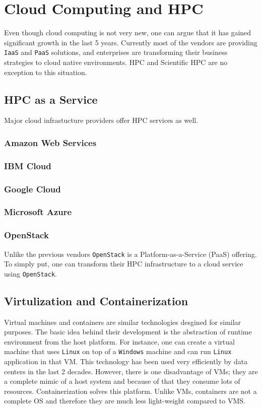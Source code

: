 \chapter{Cloud Computing and HPC}
Even though cloud computing is not very new, one can argue that it has gained significant growth
in the last 5 years. Currently most of the vendors are providing \texttt{IaaS} and \texttt{PaaS}
solutions, and enterprises are transforming their business strategies to cloud native environments. 
\newline \newline
HPC and Scientific HPC are no exception to this situation.

\section{HPC as a Service}
Major cloud infrastucture providers offer HPC services as well.
\subsection{Amazon Web Services}
\subsection{IBM Cloud}
\subsection{Google Cloud}
\subsection{Microsoft Azure}
\subsection{OpenStack}
Unlike the previous vendors \texttt{OpenStack} is a Platform-as-a-Service (PaaS) offering. To simply
put, one can transform their HPC infrastructure to a cloud service using \texttt{OpenStack}.

\section{Virtulization and Containerization}
Virtual machines and containers are similar technologies desgined for similar purposes. The basic
idea behind their development is the abstraction of runtime environment from the host platform. 
For instance, one can create a virtual machine that uses \texttt{Linux} on top of a \texttt{Windows} 
machine and can run \texttt{Linux} application in that VM. This technology has been used very 
efficiently by data centers in the last 2 decades. However, there is one disadvantage of VMs; they
are a complete mimic of a host system and because of that they consume lots of resources.   
\newline \newline
Containerization solves this platform. Unlike VMs, containers are not a complete OS and therefore
they are much less light-weight compared to VMS.
